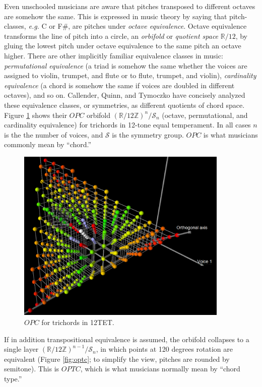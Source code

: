 \documentclass[english,11pt,letterpaper,onecolumn]{scrartcl}
\numberwithin{equation}{section}
\begin{document}
Even unschooled musicians are aware that pitches transposed to different 
octaves are somehow the same. This is expressed in music theory by saying that 
pitch-classes, \textit{e.g.} C or F\#, are pitches under \textit{octave 
equivalence}. Octave equivalence transforms the line of pitch into a circle, 
an \textit{orbifold} or \textit{quotient space} $\mathbb{R}/12$, by gluing the 
lowest pitch under octave equivalence to the same pitch an octave higher. There 
are other implicitly familiar equivalence classes in music: 
\textit{permutational equivalence} (a triad is somehow the same whether the 
voices are assigned to violin, trumpet, and flute or to flute, trumpet, and 
violin), \textit{cardinality equivalence} (a chord is somehow the same if 
voices are doubled in different octaves), and so on. Callender, Quinn, and 
Tymoczko \cite{callender:346} have concisely analyzed these equivalence 
classes, or symmetries, as different quotients of chord space. Figure 
\ref{fig:opc} shows their $OPC$ orbifold  
$\left(\mathbb{R}/12\mathbb{Z}\right)^{n}/\mathcal{S}_{n}$ (octave, 
permutational, and cardinality equivalence) for trichords in 12-tone equal 
temperament. In all cases $n$ is the the number of voices, and $\mathcal{S}$ 
is the symmetry group. $OPC$ is what musicians commonly mean by ``chord.''

    \begin{figure}
        \centerline{\includegraphics[width = 0.9\textwidth]{opc}}
        \caption{\label{fig:opc} 
           $OPC$ for trichords in 12TET.}
    \end{figure}
    
If in addition transpositional equivalence is assumed, the orbifold collapses 
to a single layer $\left(\mathbb{R}/12\mathbb{Z}\right)^{n-1}/\mathcal{S}_{n}$, 
in which points at 120 degrees rotation are equivalent (Figure \ref{fig:optc}; 
to simplify the view, pitches are rounded by semitone). This is $OPTC$, which 
is what musicians normally mean by ``chord type.''
\end{document}
